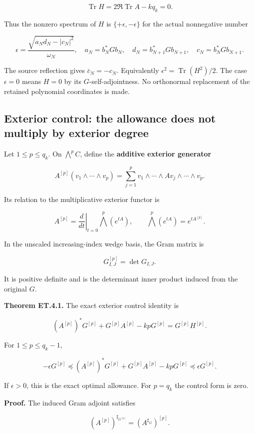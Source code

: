 \[
\operatorname{Tr}H=2\Re\operatorname{Tr}A-kq_k=0.
\]

Thus the nonzero spectrum of \(H\) is \(\{+\epsilon,-\epsilon\}\) for
the actual nonnegative number

\[
\boxed{
\epsilon=
\frac{\sqrt{a_Nd_N-|c_N|^2}}{\omega_N},\quad
 a_N=b_N^*Gb_N,\quad d_N=b_{N+1}^*Gb_{N+1},\quad
 c_N=b_N^*Gb_{N+1}.
}
\]

The source reflection gives \(\bar c_N=-c_N\). Equivalently
\(\epsilon^2=\operatorname{Tr}(H^2)/2\). The case \(\epsilon=0\) means
\(H=0\) by its \(G\)-self-adjointness. No orthonormal replacement of the
retained polynomial coordinates is made.

\subsection{Exterior control: the allowance does not multiply by
exterior
degree}\label{exttrace-exterior-control-the-allowance-does-not-multiply-by-exterior-degree}

Let \(1\leq p\leq q_k\). On \(\bigwedge^p C\), define the
\textbf{additive exterior generator}

\[
A^{[p]}(v_1\wedge\cdots\wedge v_p)
=\sum_{j=1}^p
v_1\wedge\cdots\wedge Av_j\wedge\cdots\wedge v_p.
\]

Its relation to the multiplicative exterior functor is

\[
A^{[p]}=\left.\frac{d}{dt}\right|_{t=0}\bigwedge^p(e^{tA}),
\qquad
\bigwedge^p(e^{tA})=e^{tA^{[p]}}.
\]

In the unscaled increasing-index wedge basis, the Gram matrix is

\[
G^{[p]}_{I,J}=\det G_{I,J}.
\]

It is positive definite and is the determinant inner product induced
from the original \(G\).

\textbf{Theorem ET.4.1.} The exact exterior control identity is

\[
\boxed{
(A^{[p]})^*G^{[p]}+G^{[p]}A^{[p]}-kpG^{[p]}
=G^{[p]}H^{[p]}.
}
\]

For \(1\leq p\leq q_k-1\),

\[
\boxed{
-\epsilon G^{[p]}
\preceq
(A^{[p]})^*G^{[p]}+G^{[p]}A^{[p]}-kpG^{[p]}
\preceq\epsilon G^{[p]}.
}
\]

If \(\epsilon>0\), this is the exact optimal allowance. For \(p=q_k\)
the control form is zero.

\textbf{Proof.} The induced Gram adjoint satisfies

\[
(A^{[p]})^{\sharp_{G^{[p]}}}=(A^{\sharp_G})^{[p]}.
\]

